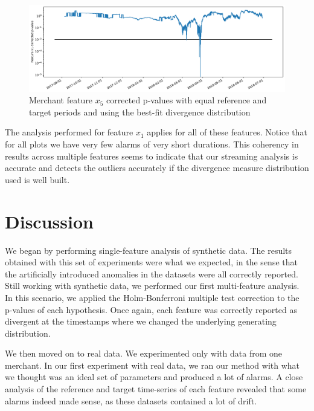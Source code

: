 \documentclass[sigconf]{acmart}
\begin{document}
\begin{figure}[!htb]
    \begin{center}
      \includegraphics[scale=0.25]{figures/merchant3-x5-correctedpvalues.pdf}
      \caption{Merchant feature $x_5$ corrected p-values with equal reference and target periods and using the best-fit divergence distribution}
      \label{fig:merchant3-x5-correctedpvalues}
    \end{center}
\end{figure}
The analysis performed for feature $x_1$ applies for all of these features. Notice that for all plots we have very few alarms of very short durations. This coherency in results across multiple features seems to indicate that our streaming analysis is accurate and detects the outliers accurately if the divergence measure distribution used is well built.


\section{Discussion} \label{sec:Discussion}
We began by performing single-feature analysis of synthetic data. The results obtained with this set of experiments were what we expected, in the sense that the artificially introduced anomalies in the datasets were all correctly reported. Still working with synthetic data, we performed our first multi-feature analysis. In this scenario, we applied the Holm-Bonferroni multiple test correction to the p-values of each hypothesis. Once again, each feature was correctly reported as divergent at the timestamps where we changed the underlying generating distribution.

We then moved on to real data. We experimented only with data from one merchant. In our first experiment with real data, we ran our method with what we thought was an ideal set of parameters and produced a lot of alarms. A close analysis of the reference and target time-series of each feature revealed that some alarms indeed made sense, as these datasets contained a lot of drift. 
\end{document}
